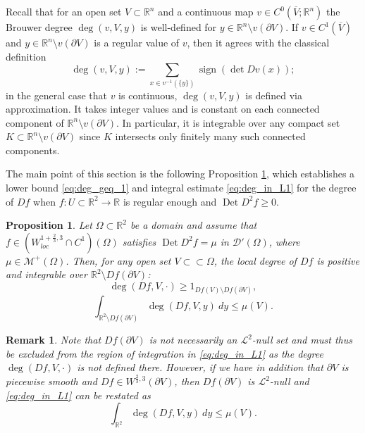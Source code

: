 \documentclass[12pt]{article}
\newcommand{\R}{\mathbb{R}}
\newcommand{\Det}{\operatorname{Det}}
\theoremstyle{plain}
\newtheorem{proposition}[theorem]{Proposition}
\newtheorem{remark}[theorem]{Remark}
\numberwithin{equation}{section}
\begin{document}
Recall that for an open set $V \subset \R^n$ and a continuous map $v \in C^0(\overline V;\R^n)$ the Brouwer degree $\deg(v,V,y)$ is well-defined for $y \in \R^n \setminus v(\partial V)$. If $v \in C^1(\overline V)$ and $y \in \R^n \setminus v(\partial V)$ is a regular value of $v$, then it agrees with the classical definition
\begin{equation*}
    \deg(v,V,y) := \sum_{x \in v^{-1}(\{y\})} \operatorname{sign}(\det Dv(x));
\end{equation*}
in the general case that $v$ is continuous, $\deg(v,V,y)$ is defined via approximation. It takes integer values and is constant on each connected component of $\R^n \setminus v(\partial V)$. In particular, it is integrable over any compact set $K \subset \R^n \setminus v(\partial V)$ since $K$ intersects only finitely many such connected components. 

The main point of this section is the following Proposition \ref{prop:deg_when_mu_positive}, which establishes a lower bound \eqref{eq:deg_geq_1} and integral estimate \eqref{eq:deg_in_L1} for the degree of $Df$ when $f : U \subset \R^2 \to \R$ is regular enough and $\Det D^2 f \geq 0$.

\begin{proposition} \label{prop:deg_when_mu_positive}
    Let $\Omega \subset \R^2$ be a domain and assume that $f \in (W^{1+\frac23,3}_{loc} \cap C^1)(\Omega)$ satisfies $\Det D^2 f = \mu$ in $\mathcal{D}'(\Omega)$, where $\mu \in \mathcal{M}^+(\Omega)$. Then, for any open set $V \subset \subset \Omega$, the local degree of $Df$ is positive and integrable over $\R^2 \setminus Df(\partial V)$:
    \begin{equation} \label{eq:deg_geq_1}
        \deg(Df, V,\cdot) \geq 1_{Df(V) \setminus Df (\partial V)},
    \end{equation}
    \begin{equation} \label{eq:deg_in_L1}
        \int_{\R^2 \setminus Df(\partial V)} \deg(Df, V,y)~dy\leq \mu(V).
    \end{equation}
\end{proposition}

\begin{remark} \label{rem:deg_formula_nobdry}
    Note that $Df(\partial V)$ is not necessarily an $\mathcal{L}^2$-null set and must thus be excluded from the region of integration in \eqref{eq:deg_in_L1} as the degree $\deg(Df, V, \cdot)$ is not defined there. However, if we have in addition that $\partial V$ is piecewise smooth and $Df \in W^{\frac23,3}(\partial V)$, then $Df(\partial V)$ is $\mathcal{L}^2$-null \cite[Theorem B.1]{li_pakzad_schikorra_21} and \eqref{eq:deg_in_L1} can be restated as 
    \begin{equation*}
        \int_{\R^2} \deg(Df, V,y)~dy\leq \mu(V).
    \end{equation*}
\end{remark}
\end{document}
